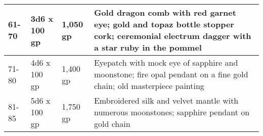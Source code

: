 \begin{longtable}{llllllll}
\hline
\multicolumn{5}{p{3.040in}|}{\begin{minipage}[t]{3.040in}\raggedright
61-70\end{minipage}} & \multicolumn{1}{|p{0.349in}|}{\begin{minipage}[t]{0.349in}\raggedright
3d6 x 100 gp\end{minipage}} & \multicolumn{1}{p{0.661in}|}{\begin{minipage}[t]{0.661in}\raggedright
1,050 gp\end{minipage}} & \multicolumn{1}{p{0.450in}|}{\begin{minipage}[t]{0.450in}\raggedright
Gold dragon comb with red garnet eye; gold and topaz bottle stopper cork; ceremonial 
electrum dagger with a star ruby in the pommel\end{minipage}}\\
\hline
\multicolumn{5}{p{3.040in}|}{\begin{minipage}[t]{3.040in}\raggedright
71-80\end{minipage}} & \multicolumn{1}{|p{0.349in}|}{\begin{minipage}[t]{0.349in}\raggedright
4d6 x 100 gp\end{minipage}} & \multicolumn{1}{p{0.661in}|}{\begin{minipage}[t]{0.661in}\raggedright
1,400 gp\end{minipage}} & \multicolumn{1}{p{0.450in}|}{\begin{minipage}[t]{0.450in}\raggedright
Eyepatch with mock eye of sapphire and moonstone; fire opal pendant on a fine gold 
chain; old masterpiece painting\end{minipage}}\\
\hline
\multicolumn{5}{p{3.040in}|}{\begin{minipage}[t]{3.040in}\raggedright
81-85\end{minipage}} & \multicolumn{1}{|p{0.349in}|}{\begin{minipage}[t]{0.349in}\raggedright
5d6 x 100 gp\end{minipage}} & \multicolumn{1}{p{0.661in}|}{\begin{minipage}[t]{0.661in}\raggedright
1,750 gp\end{minipage}} & \multicolumn{1}{p{0.450in}|}{\begin{minipage}[t]{0.450in}\raggedright
Embroidered silk and velvet mantle with numerous moonstones; sapphire pendant on 
gold chain\end{minipage}}\\
\hline

\end{longtable}
